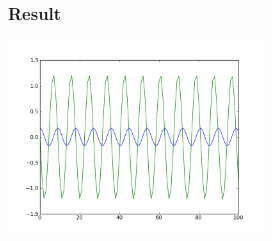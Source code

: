 \begin{frame}[fragile]
\frametitle{Result}
\begin{center}
\includegraphics[height=2in, interpolate=true]{images/ode}  
\end{center}
\end{frame}







